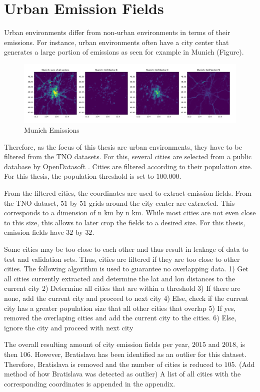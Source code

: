 \section{Urban Emission Fields}
Urban environments differ from non-urban environments in terms of their emissions.
For instance, urban environments often have a city center that generates a large portion of emissions as seen for example in Munich (Figure).
\begin{figure}[h!]
    \centering
    \includegraphics[width=\textwidth]{figures/03_dataset/Munich_plot.png}
    \caption{Munich Emissions}
\end{figure}
Therefore, as the focus of this thesis are urban environments, they have to be filtered from the TNO datasets.
For this, several cities are selected from a public database by OpenDatasoft \parencite{OpenDataSoft}.
Cities are filtered according to their population size.
For this thesis, the population threshold is set to $100.000$.

From the filtered cities, the coordinates are used to extract emission fields.
From the TNO dataset, $51$ by $51$ grids around the city center are extracted.
This corresponds to a dimension of n km by n km.
While most cities are not even close to this size, this allows to later crop the fields to a desired size.
For this thesis, emission fields have $32$ by $32$.

Some cities may be too close to each other and thus result in leakage of data to test and validation sets.
Thus, cities are filtered if they are too close to other cities.
The following algorithm is used to guarantee no overlapping data.
1) Get all cities currently extracted and determine the lat and lon distances to the current city
2) Determine all cities that are within a threshold
3) If there are none, add the current city and proceed to next city
4) Else, check if the current city has a greater population size that all other cities that overlap
5) If yes, removed the overlaping cities and add the current city to the cities.
6) Else, ignore the city and proceed with next city

The overall resulting amount of city emission fields per year, $2015$ and $2018$, is then $106$.
However, Bratislava has been identified as an outlier for this dataset.
Therefore, Bratislava is removed and the number of cities is reduced to $105$.
(Add method of how Bratislava was detected as outlier)
A list of all cities with the corresponding coordinates is appended in the appendix.

